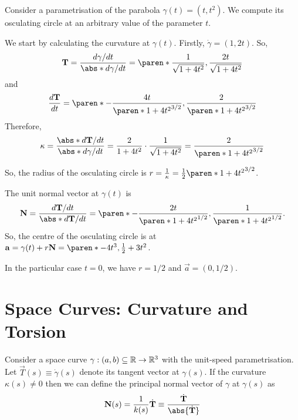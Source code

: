 \documentclass[11pt]{penrose}
\newcommand{\vT}{\vec{T}}
\newcommand{\vN}{\vec{N}}
\newcommand{\keyword}[1]{\textsf{#1}}
\begin{document}
\begin{negg}
    Consider a parametrisation of the parabola $\gamma(t) = (t, t^2)$. We compute its osculating circle at an arbitrary value of the parameter $t$.

    We start by calculating the curvature at $\gamma(t)$. Firstly, $\dot{\gamma} = (1, 2t)$. So,
    \begin{equation}
        \vT = \frac{d\gamma/dt}{\abs*{ d\gamma/dt }} = \paren*{ \frac{1}{\sqrt{1 + 4t^2}}, \frac{2t}{\sqrt{1 + 4t^2}} }
    \end{equation}
    and
    \begin{equation}
        \frac{d\vT}{dt} = \paren*{ -\frac{4t}{\paren*{1+4t^2}^{3/2}}, \frac{2}{\paren*{1+4t^2}^{3/2}} }
    \end{equation}
    Therefore,
    \begin{equation}
        \kappa
        = \frac{\abs*{ d\vT/dt }}{\abs*{ d\gamma/dt }}
        = \frac{2}{1+4t^2} \cdot \frac{1}{\sqrt{1 + 4t^2}}
        = \frac{2}{ \paren*{1+4t^2}^{3/2} }
    \end{equation}

    So, the radius of the osculating circle is $r = \frac{1}{\kappa} = \frac{1}{2}\paren*{1+4t^2}^{3/2}$.

    The unit normal vector at $\gamma(t)$ is
    \begin{equation}
        \vN
        = \frac{ d\vT/dt }{\abs*{ d\vT/dt }}
        = \paren*{ -\frac{2t}{\paren*{1+4t^2}^{1/2}}, \frac{1}{\paren*{1+4t^2}^{1/2}} }.
    \end{equation}
    So, the centre of the osculating circle is at $\vec{a} = \gamma(t) + r\vN = \paren*{ -4 t^3, \frac{1}{2} + 3t^2 }$.

    In the particular case $t=0$, we have $r = 1/2$ and $\vec{a} = (0, 1/2)$.
\end{negg}

\section{Space Curves: Curvature and Torsion}
Consider a space curve $\gamma : (a, b) \subseteq \mathbb{R} \to \mathbb{R}^3$ with the unit-speed parametrisation. Let $\vT(s) \equiv \dot{\gamma}(s)$ denote its tangent vector at $\gamma(s)$. If the curvature $\kappa(s) \neq 0$ then we can define the \keyword{principal normal} vector of $\gamma$ at $\gamma(s)$ as
\begin{equation}
    \vN(s) = \frac{1}{k(s)} \dot{\vT} \equiv \frac{\dot{\vT}}{\abs{\dot{\vT}}}
    \label{eq:principal-normal-dfn}
\end{equation}
\end{document}
